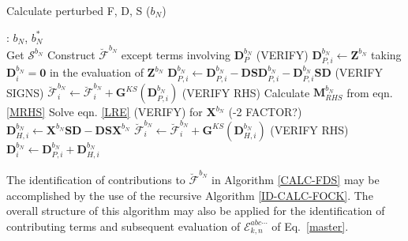 \documentclass[%
 reprint,
 amsmath,amssymb,
 aps,
]{revtex4-1}
\begin{document}
\begin{algorithm}
\caption{Calculate perturbed F, D, S ($b_{N}$)}
\label{CALC-FDS}
\begin{algorithmic}
: $b_{N}$, $b_{N}^{*}$\\

\State Get $\bm{\mathcal{S}}^{b_N}$
\State Construct $\breve{\bm{\mathcal{F}}}^{b_N}$ except terms involving $\mathbf{D}_{P}^{b_N}$ (VERIFY)
\State  $\mathbf{D}_{P, i}^{b_N} \gets \mathbf{Z}^{b_N}$ taking $\mathbf{D}_{i}^{b_N} = \mathbf{0}$ in the evaluation of $\mathbf{Z}^{b_N}$
\State  $\mathbf{D}_{P, i}^{b_N} \gets \mathbf{D}_{P, i}^{b_N} - \mathbf{D} \mathbf{S} \mathbf{D}_{P, i}^{b_N} - \mathbf{D}_{P, i}^{b_N} \mathbf{S} \mathbf{D}$ (VERIFY SIGNS)
 \State $\breve{\bm{\mathcal{F}}}_{i}^{b_N} \gets \breve{\bm{\mathcal{F}}}_{i}^{b_N} + \mathbf{G}^{KS}(\mathbf{D}^{b_N}_{P, i})$ (VERIFY RHS) 
\State  Calculate $\mathbf{M}_{RHS}^{b_N}$ from eqn. \eqref{MRHS}
\State  Solve eqn. \eqref{LRE} (VERIFY) for $\mathbf{X}^{b_N}$ (-2 FACTOR?)
\State  $\mathbf{D}_{H, i}^{b_N} \gets \mathbf{X}^{b_N} \mathbf{S} \mathbf{D} - \mathbf{D} \mathbf{S} \mathbf{X}^{b_N}$
\State  $\breve{\bm{\mathcal{F}}}_{i}^{b_N} \gets \breve{\bm{\mathcal{F}}}_{i}^{b_N} + \mathbf{G}^{KS}(\mathbf{D}^{b_N}_{H, i})$ (VERIFY RHS)
\State  $\mathbf{D}_{i}^{b_N} \gets \mathbf{D}_{P, i}^{b_N} + \mathbf{D}_{H, i}^{b_N}$
\EndFor
\end{algorithmic}
\end{algorithm}

The identification of contributions to $\breve{\bm{\mathcal{F}}}^{b_N}$ in Algorithm \ref{CALC-FDS} may be accomplished by the use of the recursive Algorithm \ref{ID-CALC-FOCK}. The overall structure of this algorithm may also be applied for the identification of contributing terms and subsequent evaluation of $\mathcal{E}_{k,n}^{abc\cdots}$ of Eq.~\eqref{master}.

\end{document}
